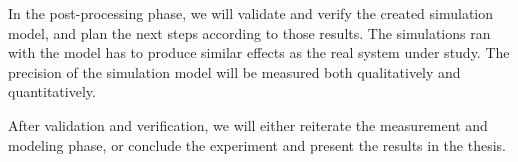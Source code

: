 In the post-processing phase, we will validate and verify the created simulation model, and plan the next steps according to those results. The simulations ran with the model has to produce similar effects as the real system under study. The precision of the simulation model will be measured both qualitatively and quantitatively.

After validation and verification, we will either reiterate the measurement and modeling phase, or conclude the experiment and present the results in the thesis.

